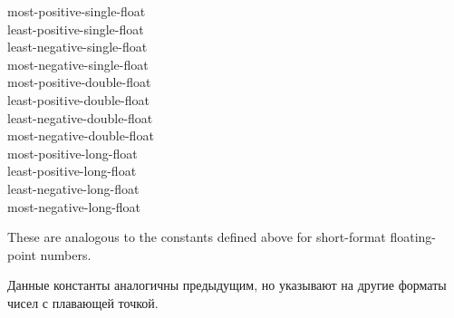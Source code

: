 \begin{defun}[Constant]
most-positive-single-float \\
least-positive-single-float \\
least-negative-single-float \\
most-negative-single-float \\
most-positive-double-float \\
least-positive-double-float \\
least-negative-double-float \\
most-negative-double-float \\
most-positive-long-float \\
least-positive-long-float \\
least-negative-long-float \\
most-negative-long-float

These are analogous to the constants defined above for short-format
floating-point numbers.

Данные константы аналогичны предыдущим, но указывают на другие форматы чисел с
плавающей точкой.
\end{defun}

\bigskip

